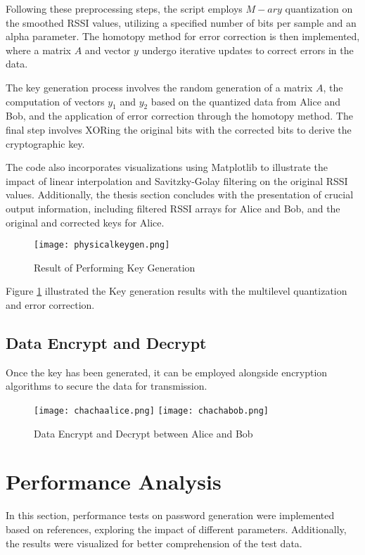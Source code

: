 Following these preprocessing steps, the script employs $M-ary$ quantization on the smoothed RSSI values, utilizing a specified number of bits per sample and an alpha parameter. The homotopy method for error correction is then implemented, where a matrix \(A\) and vector \(y\) undergo iterative updates to correct errors in the data.

The key generation process involves the random generation of a matrix \(A\), the computation of vectors \(y_1\) and \(y_2\) based on the quantized data from Alice and Bob, and the application of error correction through the homotopy method. The final step involves XORing the original bits with the corrected bits to derive the cryptographic key.

The code also incorporates visualizations using Matplotlib to illustrate the impact of linear interpolation and Savitzky-Golay filtering on the original RSSI values. Additionally, the thesis section concludes with the presentation of crucial output information, including filtered RSSI arrays for Alice and Bob, and the original and corrected keys for Alice.
\begin{figure}
  \centering
  \texttt{[image: physicalkeygen.png]}
  \caption{Result of Performing Key Generation}
  \label{physicalkeygen}
\end{figure}

Figure \ref{physicalkeygen} illustrated the Key generation results with the multilevel quantization and error correction.

\subsection{Data Encrypt and Decrypt}
Once the key has been generated, it can be employed alongside encryption algorithms to secure the data for transmission.

\begin{figure}
  \centering
  {\texttt{[image: chachaalice.png]}}
  {\texttt{[image: chachabob.png]}}
  \caption{Data Encrypt and Decrypt between Alice and Bob}\label{Data Encrypt and Decrypt}
\end{figure}

\section{Performance Analysis}
In this section, performance tests on password generation were implemented based on references, exploring the impact of different parameters. Additionally, the results were visualized for better comprehension of the test data.
